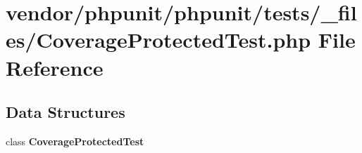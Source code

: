 \section{vendor/phpunit/phpunit/tests/\+\_\+files/\+Coverage\+Protected\+Test.php File Reference}
\label{phpunit_2tests_2__files_2_coverage_protected_test_8php}
\subsection*{Data Structures}
\begin{DoxyCompactItemize}
\item 
class {\bf Coverage\+Protected\+Test}
\end{DoxyCompactItemize}
